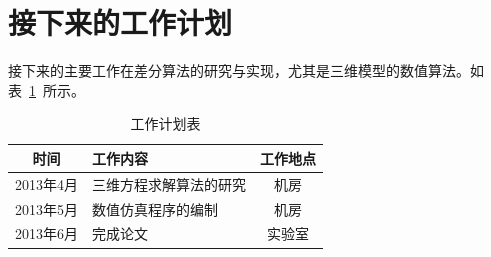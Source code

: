 \documentclass[a4paper,cs4size,adobefonts,fancyhdr]{ctexart}[2005/11/25]
\numberwithin{equation}{section} %
\begin{document}
\section{接下来的工作计划}
接下来的主要工作在差分算法的研究与实现，尤其是三维模型的数值算法。如表~\ref{tab:test}~所示。
\begin{table}[htbp]
\centering\caption{\label{tab:test}工作计划表}
\begin{tabularx}{14cm}{cXc}
\toprule
时间 & \centering 工作内容 & 工作地点 \\
\midrule
2013年4月					& 三维方程求解算法的研究				&	机房			  \\
2013年5月					& 数值仿真程序的编制				&	机房			  \\
2013年6月					& 完成论文						&   实验室		  \\
\bottomrule
\end{tabularx}
\end{table}
\newpage
\nocite{*}


\newpage
\end{document}
